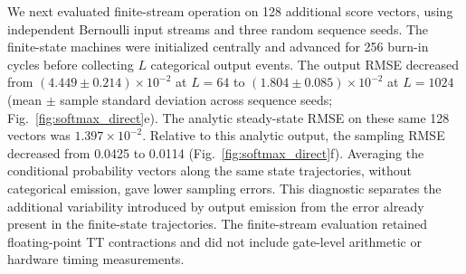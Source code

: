 We next evaluated finite-stream operation on 128 additional score vectors,
using independent Bernoulli input streams and three random sequence seeds.
The finite-state machines were initialized centrally and advanced for 256
burn-in cycles before collecting $L$ categorical output events. The output
RMSE decreased from
$(4.449\pm0.214)\times10^{-2}$ at $L=64$ to
$(1.804\pm0.085)\times10^{-2}$ at $L=1024$
(mean $\pm$ sample standard deviation across sequence seeds;
Fig.~\ref{fig:softmax_direct}e). The analytic steady-state RMSE on these
same 128 vectors was $1.397\times10^{-2}$. Relative to this analytic
output, the sampling RMSE decreased from 0.0425 to 0.0114
(Fig.~\ref{fig:softmax_direct}f). Averaging the conditional probability
vectors along the same state trajectories, without categorical emission,
gave lower sampling errors. This diagnostic separates the additional
variability introduced by output emission from the error already present in
the finite-state trajectories. The finite-stream evaluation retained
floating-point TT contractions and did not include gate-level arithmetic or
hardware timing measurements.
